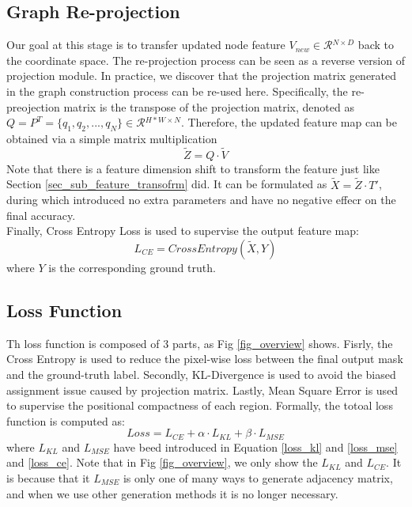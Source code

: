\documentclass[journal]{IEEEtran}
\begin{document}
  
\subsection{Graph Re-projection}  
 
    Our goal at this stage is to transfer updated node feature $V_{new}\in\mathcal{R}{^{N\times D}}$ back to the coordinate space. The re-projection process can be seen as a reverse version of projection module. In practice, we discover that the projection matrix generated in the graph construction process can be re-used here. Specifically, the re-preojection matrix is the transpose of the projection matrix, denoted as  $Q=P^T=\{q_1, q_2, ..., q_N \}\in \mathcal{R}{^{H*W \times N}}$. Therefore, the updated feature map can be obtained via a simple matrix multiplication
    \begin{equation}
        \tilde{Z}={Q} \cdot \tilde{V}
    \end{equation}
    Note that there is a feature dimension shift to transform the feature just like Section \ref{sec_sub_feature_transofrm} did. It can be formulated as $\tilde{X} = \tilde{Z} \cdot T'$, during which introduced no extra parameters and have no negative effecr on the final accuracy. \\   


 
    Finally, Cross Entropy Loss is used to supervise the output feature map:
    \begin{equation}\label{loss_ce}
        L_{CE} = CrossEntropy(\tilde{X}, Y)
    \end{equation}
    where $Y$ is the corresponding ground truth.

\subsection{Loss Function}  
 
    Th loss function is composed of 3 parts, as Fig \ref{fig_overview} shows. Fisrly, the Cross Entropy is used to reduce the pixel-wise loss between the final output mask and the ground-truth label. Secondly, KL-Divergence is used to avoid the biased assignment issue caused by projection matrix. Lastly, Mean Square Error is used to supervise the positional compactness of each region. Formally, the totoal loss function is computed as:
    \begin{equation}
        Loss =  L_{CE} + \alpha  \cdot L_{KL} + \beta \cdot L_{MSE}
    \end{equation}
    where $L_{KL}$ and $L_{MSE}$ have beed introduced in Equation \ref{loss_kl} and \ref{loss_mse} and \ref{loss_ce}. Note that in Fig \ref{fig_overview}, we only show the $L_{KL}$ and $L_{CE}$. It is because that it $L_{MSE}$ is only one of many ways to generate adjacency matrix, and when we use other generation methods it is no longer necessary.  \\     
\end{document}
